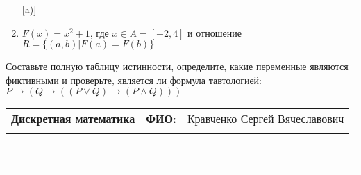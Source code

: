 \documentclass[10pt]{exam}
\newcommand{\class}{Дискретная математика}
\newcommand{\examdate}{}
\begin{document}
\begin{questions}
\begin{enumerate} [a)]
\item $F(x)=x^{2}+1$, где $x \in A = [-2, 4]$ и отношение $R = \{(a,b)|F(a) = F(b)\}$
\end{enumerate}\question Составьте полную таблицу истинности, определите, какие переменные являются фиктивными и проверьте, является ли формула тавтологией:
$ P \rightarrow (Q \rightarrow ((P \lor Q) \rightarrow (P \land Q)))$

\end{questions}
\newpage
\begin{flushright}
\begin{tabular}{p{2.8in} r l}
\textbf{\class} & \textbf{ФИО:} &Кравченко Сергей Вячеславович
\\

\textbf{\examdate} &&\\
\end{tabular}\\
\end{flushright}
\rule[1ex]{\textwidth}{.1pt}
\end{document}

